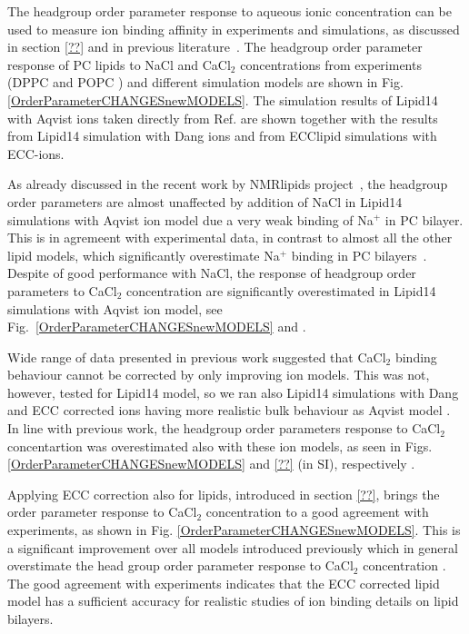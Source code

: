 \documentclass[aip,jcp,twocolumn]{revtex4}
\begin{document}
The headgroup order parameter response to aqueous ionic concentration
can be used to measure ion binding affinity in experiments and simulations,
as discussed in section \ref{??} and in previous literature~\cite{seelig87,catte16}.
The headgroup order parameter response of PC lipids to NaCl and CaCl$_2$ concentrations
from experiments (DPPC \cite{akutsu81} and POPC \cite{altenbach84}) and different simulation
models are shown in Fig. \ref{OrderParameterCHANGESnewMODELS}.
The simulation results of Lipid14 with Aqvist ions \cite{??} taken directly from
Ref.  are shown together with the results from Lipid14 simulation
with Dang ions \cite{??} and from ECClipid simulations with ECC-ions.

As already discussed in the recent work by NMRlipids project~\cite{catte16},
the headgroup order parameters are almost unaffected by addition of NaCl
in Lipid14 simulations with Aqvist ion model due a very weak binding of Na$^+$
in PC bilayer. This is in agremeent with experimental data, in contrast
to almost all the other lipid models, which significantly overestimate
Na$^+$ binding in PC bilayers~\cite{catte16}. Despite of good performance
with NaCl, the response of headgroup order parameters to CaCl$_2$ concentration are
significantly overestimated in Lipid14 simulations with Aqvist ion model,
see Fig.~\ref{OrderParameterCHANGESnewMODELS} and .

Wide range of data presented in previous work \cite{catte16} suggested
that CaCl$_2$ binding behaviour cannot be corrected by only improving
ion models. This was not, however, tested for Lipid14 model, so we
ran also Lipid14 simulations with Dang \cite{smith94,chang1999,dang2006} and ECC corrected \cite{??}
ions having more realistic bulk behaviour as Aqvist model \cite{??}.
In line with previous work, the headgroup order parameters response
to CaCl$_2$ concentartion was overestimated also with these ion models,
as seen in Figs. \ref{OrderParameterCHANGESnewMODELS} and \ref{??} (in SI), respectively
.

Applying ECC correction also for lipids, introduced in section \ref{??},
brings the order parameter response to CaCl$_2$ concentration to a
good agreement with experiments, as shown in Fig. \ref{OrderParameterCHANGESnewMODELS}.
This is a significant improvement over all models introduced previously
which in general overstimate the head group order parameter response to CaCl$_2$
concentration \cite{catte16}. The good agreement with experiments indicates
that the ECC corrected lipid model has a sufficient accuracy for realistic
studies of ion binding details on lipid bilayers.
\end{document}
